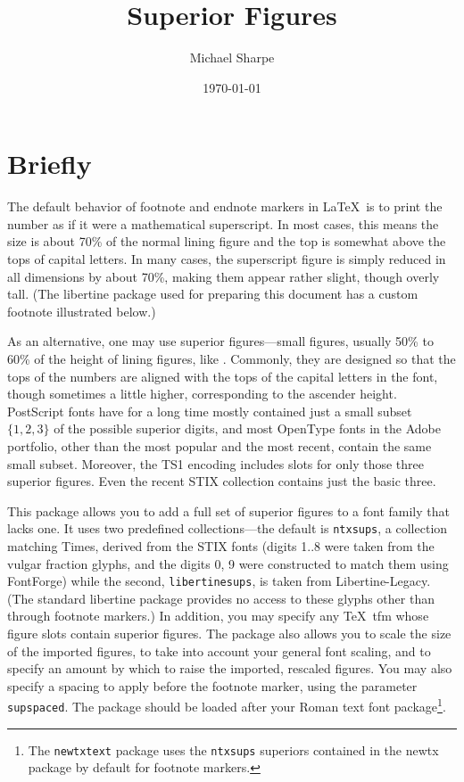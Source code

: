 \documentclass[11pt]{amsart}
\title{Superior Figures}
\author{Michael Sharpe}
\date{\today}  %
\begin{document}
\maketitle
\section{Briefly}
The default behavior of footnote and endnote markers in \LaTeX\ is to print the number as if it were a mathematical superscript. In most cases, this means the size is about 70\% of the normal lining figure and the top is somewhat above the tops of capital letters. In many cases, the superscript figure is simply reduced in all dimensions by about 70\%, making them appear rather slight, though overly tall. (The \textsf{libertine} package used for preparing this document has a custom footnote illustrated below.)

As an alternative, one may use superior figures---small figures, usually 50\% to 60\% of the height of lining figures, like . Commonly, they are designed so that the tops of the numbers are aligned with the tops of the capital letters in the font, though sometimes a little higher, corresponding to the ascender height. PostScript fonts have for a long time mostly contained just a small subset $\{1,2,3\}$ of the possible superior digits, and most OpenType fonts in the Adobe portfolio, other than the most popular and the most recent, contain the same small subset. Moreover, the \textsf{TS1} encoding includes slots for only those three superior figures. Even the recent STIX collection contains just the basic three.


This package allows you to add a full set of superior figures to a font family that lacks one. It uses two predefined collections---the default is {\tt ntxsups}, a collection matching Times, derived from the STIX fonts (digits 1..8 were taken from the vulgar fraction glyphs, and the digits 0, 9 were constructed to match them using FontForge) while the second, {\tt libertinesups}, is taken from Libertine-Legacy. (The standard \textsf{libertine} package provides no access to these glyphs other than through footnote markers.) In addition, you may specify any \TeX\ tfm whose figure slots contain superior figures. The package also allows you to scale the size of the imported figures, to take into account your general font scaling,  and to specify an amount by which to raise the imported, rescaled figures. You may also specify a spacing to apply before the footnote marker, using the parameter {\tt supspaced}. The package should be loaded after your Roman text font package\footnote{The {\tt newtxtext} package uses the {\tt ntxsups} superiors contained in the newtx package by default for footnote markers.}. 
\end{document}
